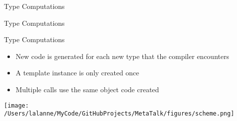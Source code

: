 \begin{frame}{Type Computations}
    \begin{center}
    \end{center}
\end{frame}

\begin{frame}{Type Computations}
    \begin{center}
    \end{center}
\end{frame}

\begin{frame}[t]{Type Computations}
    \begin{itemize}
        \item New code is generated for each new type that the compiler encounters
        \item A template instance is only created once
        \item Multiple calls use the same object code created
    \end{itemize}
    \begin{center}
        \texttt{[image: /Users/lalanne/MyCode/GitHubProjects/MetaTalk/figures/scheme.png]}
    \end{center}
\end{frame}






